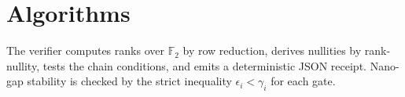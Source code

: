\section{Algorithms}
The verifier computes ranks over $\mathbb F_2$ by row reduction, derives nullities by rank-nullity, tests the chain conditions, and emits a deterministic JSON receipt. Nano-gap stability is checked by the strict inequality $\epsilon_i<\gamma_i$ for each gate.
